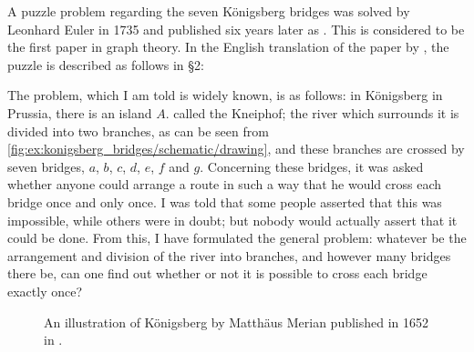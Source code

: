 \begin{example}\label{ex:konigsberg_bridges}
  A puzzle problem regarding the seven K\"onigsberg bridges was solved by Leonhard Euler in 1735 and published six years later as \cite{Euler1741Bridges}. This is considered to be the first paper in graph theory. In the English translation of the paper by , the puzzle is described as follows in \S 2:
  \begin{displayquote}
    The problem, which I am told is widely known, is as follows: in K\"onigsberg in Prussia, there is an island \( A \). called the Kneiphof; the river which surrounds it is divided into two branches, as can be seen from \cref{fig:ex:konigsberg_bridges/schematic/drawing}, and these branches are crossed by seven bridges, \( a \), \( b \), \( c \), \( d \), \( e \), \( f \) and \( g \). Concerning these bridges, it was asked whether anyone could arrange a route in such a way that he would cross each bridge once and only once. I was told that some people asserted that this was impossible, while others were in doubt; but nobody would actually assert that it could be done. From this, I have formulated the general problem: whatever be the arrangement and division of the river into branches, and however many bridges there be, can one find out whether or not it is possible to cross each bridge exactly once?
  \end{displayquote}

  \begin{figure}[ht!]
    \caption{An illustration of K\"onigsberg by Matth\"aus Merian published in 1652 in \cite{Merian1652KönigsbergBridges}.}
    \label{fig:ex:konigsberg_bridges/illustration}
  \end{figure}


\end{example}
